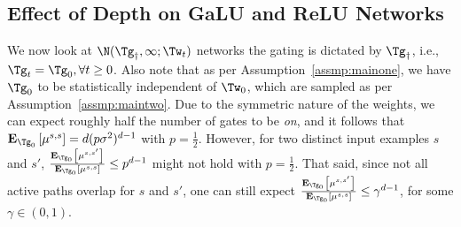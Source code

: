 \subsection{Effect of Depth on GaLU and ReLU Networks}
We now look at $\N(\Tg_{\dagger}, \infty;\Tw_t)$ networks the gating is dictated by $\Tg_{\dagger}$, i.e., $\Tg_t=\Tg_0,\forall t\geq 0$. Also note that as per Assumption~\ref{assmp:mainone}, we have $\Tg_0$ to be statistically independent of $\Tw_0$, which are sampled as per Assumption~\ref{assmp:maintwo}. Due to the symmetric nature of the weights, we can expect roughly half the number of gates to be \emph{on}, and it follows that $\mathbf{E}_{\Tg_0}\left[ \mu^{s,s}\right]=d(p\sigma^2)^{d-1}$ with $p=\frac12$. However, for two distinct input examples $s$ and $s'$, $\frac{\mathbf{E}_{\Tg_0}\left[ \mu^{s,s'}\right]}{\mathbf{E}_{\Tg_0}\left[ \mu^{s,s}\right]}\leq p^{d-1}$ might not hold with $p=\frac12$. That said, since not all active paths overlap for $s$ and $s'$, one can still expect $\frac{\mathbf{E}_{\Tg_0}\left[ \mu^{s,s'}\right]}{\mathbf{E}_{\Tg_0}\left[ \mu^{s,s}\right]}\leq \gamma^{d-1}$, for some $\gamma\in (0,1)$.

